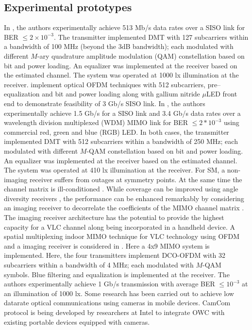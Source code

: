 \subsection{Experimental prototypes}
\label{relatedExperiments}
In \cite{vuc10a}, the authors experimentally achieve 513 Mb/s data rates over a SISO link for BER $\leq 2\times10^{-3}$. The transmitter implemented DMT with 127 subcarriers within a bandwidth of 100 MHz (beyond the 3dB bandwidth); each modulated with different $M$-ary quadrature amplitude modulation (QAM) constellation based on bit and power loading. An equalizer was implemented at the receiver based on the estimated channel. The system was operated at 1000 lx illumination at the receiver. \cite{tso14a} implement optical OFDM techniques with 512 subcarriers, pre--equalization and bit and power loading along with gallium nitride $\mu$LED front end to demonstrate feasibility of 3 Gb/s SISO link. In \cite{cos12a}, the authors experimentally achieve 1.5 Gb/s for a SISO link and 3.4 Gb/s data rates over a wavelength division multiplexed (WDM) MIMO link for BER $\leq 2*10^{-3}$ using commercial red, green and blue (RGB) LED. In both cases, the transmitter implemented DMT with 512 subcarriers within a bandwidth of 250 MHz; each modulated with different $M$-QAM constellation based on bit and power loading. An equalizer was implemented at the receiver based on the estimated channel. The system was operated at 410 lx illumination at the receiver. For SM, a non-imaging receiver suffers from outages at symmetry points. At the same time the channel matrix is ill-conditioned \cite{zen09a}.  While coverage can be improved using angle diversity receivers \cite{car00a}, the performance can be enhanced remarkably by considering an imaging receiver to decorrelate the coefficients of the MIMO channel matrix \cite{dja00a}. The imaging receiver architecture \cite{kah98a} has the potential to provide the highest capacity for a VLC channel along being incorporated in a handheld device. A spatial multiplexing indoor MIMO technique for VLC technology using OFDM and a imaging receiver is considered in \cite{azh13a}. Here a 4x9 MIMO system is implemented. Here, the four transmitters implement DCO-OFDM with 32 subcarriers within a bandwidth of 4 MHz; each modulated with $M$-QAM symbols. Blue filtering and equalization is implemented at the receiver. The authors experimentally achieve 1 Gb/s transmission with average BER $\leq 10^{-3}$ at an illumination of 1000 lx. Some research has been carried out to achieve low datarate optical communications using cameras in mobile devices. CamCom protocol \cite{rob13a} is being developed by researchers at Intel to integrate OWC with existing portable devices equipped with cameras.



